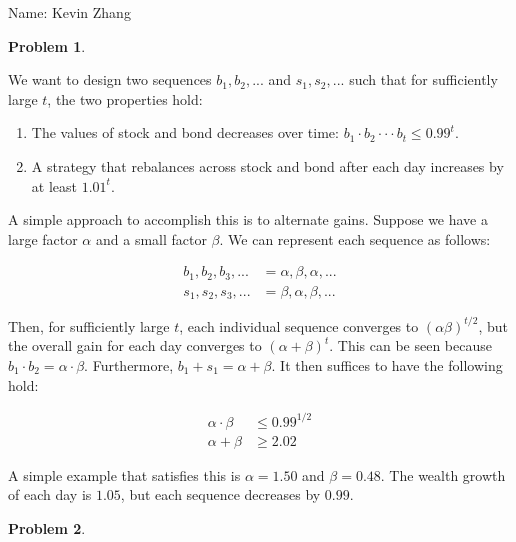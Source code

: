\documentclass[11pt]{article}
\newcommand{\yourname}{Kevin Zhang}
\theoremstyle{definition}
\theoremstyle{case}
\theoremstyle{theorem}
\newtheorem{prob}{Problem}
\begin{document}
{\large
\noindent Name: \yourname}

\vspace{15pt}

\begin{prob}
\end{prob}

We want to design two sequences $b_1, b_2, ...$ and $s_1, s_2, ...$ such that for
sufficiently large $t$, the two properties hold:

\begin{enumerate}

\item The values of stock and bond decreases over time: $b_1 \cdot b_2 \cdot \cdot \cdot b_t \leq 0.99^t$.

\item A strategy that rebalances across stock and bond after each day increases by at least $1.01^t$. 

\end{enumerate}

A simple approach to accomplish this is to alternate gains. Suppose we have a large factor $\alpha$ and a small
factor $\beta$. We can represent each sequence as follows:

\begin{align*}
  b_1, b_2, b_3, ... &= \alpha, \beta, \alpha, ... \\
  s_1, s_2, s_3, ... &= \beta, \alpha, \beta, ...
\end{align*}

Then, for sufficiently large $t$, each individual sequence converges to $(\alpha \beta)^{t/2}$, but the overall
gain for each day converges to $(\alpha + \beta)^t$. This can be seen because $b_1 \cdot b_2 = \alpha \cdot \beta$.
Furthermore, $b_1 + s_1 = \alpha + \beta$. It then suffices to have the following hold:

\begin{align*}
  \alpha \cdot \beta &\leq 0.99^{1/2} \\
  \alpha + \beta &\geq 2.02 
\end{align*}

A simple example that satisfies this is $\alpha = 1.50$ and $\beta = 0.48$. 
The wealth growth of each day is $1.05$, but each sequence decreases by $0.99$.

\newpage

\begin{prob}
\end{prob}
\end{document}
